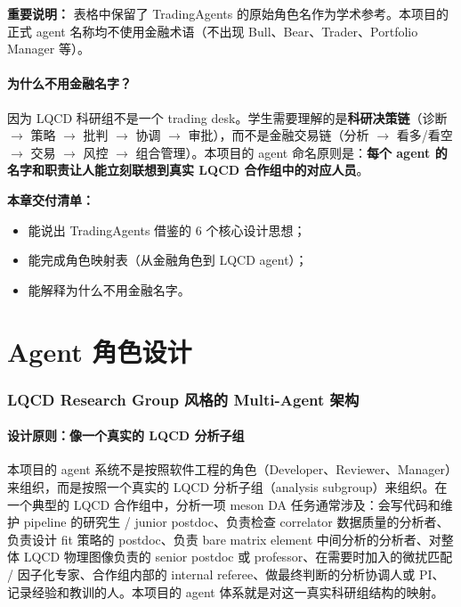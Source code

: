 \documentclass[11pt,a4paper,fontset=fandol]{ctexart}
\begin{document}
\textbf{重要说明：} 表格中保留了 TradingAgents 的原始角色名作为学术参考。本项目的正式 agent 名称均不使用金融术语（不出现 Bull、Bear、Trader、Portfolio Manager 等）。

\subsection{为什么不用金融名字？}

因为 LQCD 科研组不是一个 trading desk。学生需要理解的是\textbf{科研决策链}（诊断 $\to$ 策略 $\to$ 批判 $\to$ 协调 $\to$ 审批），而不是金融交易链（分析 $\to$ 看多/看空 $\to$ 交易 $\to$ 风控 $\to$ 组合管理）。本项目的 agent 命名原则是：\textbf{每个 agent 的名字和职责让人能立刻联想到真实 LQCD 合作组中的对应人员}。

\textbf{本章交付清单：}
\begin{itemize}
  \item 能说出 TradingAgents 借鉴的 6 个核心设计思想；
  \item 能完成角色映射表（从金融角色到 LQCD agent）；
  \item 能解释为什么不用金融名字。
\end{itemize}

\newpage
\part{Agent 角色设计}

\section{LQCD Research Group 风格的 Multi-Agent 架构}

\subsection{设计原则：像一个真实的 LQCD 分析子组}

本项目的 agent 系统不是按照软件工程的角色（Developer、Reviewer、Manager）来组织，而是按照一个真实的 LQCD 分析子组（analysis subgroup）来组织。在一个典型的 LQCD 合作组中，分析一项 meson DA 任务通常涉及：会写代码和维护 pipeline 的研究生 / junior postdoc、负责检查 correlator 数据质量的分析者、负责设计 fit 策略的 postdoc、负责 bare matrix element 中间分析的分析者、对整体 LQCD 物理图像负责的 senior postdoc 或 professor、在需要时加入的微扰匹配 / 因子化专家、合作组内部的 internal referee、做最终判断的分析协调人或 PI、记录经验和教训的人。本项目的 agent 体系就是对这一真实科研组结构的映射。
\end{document}

